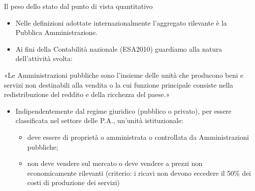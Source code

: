 \documentclass[aspectratio=64,12pt]{beamer}
\begin{document}
\begin{frame}{Il peso dello stato dal punto di vista quantitativo}
\begin{itemize}
\item Nelle definizioni adottate internazionalmente l’aggregato rilevante è la \alert{Pubblica Amministrazione}.
\item Ai fini della Contabilità nazionale (ESA2010) guardiamo alla natura dell’attività
svolta:
\end{itemize}
\begin{quoting}
«Le Amministrazioni pubbliche sono l’insieme delle unità che producono beni e
servizi non destinabili alla vendita o la cui funzione principale consiste
nella redistribuzione del reddito e della ricchezza del paese.»
\end{quoting}
\begin{itemize}
\item Indipendentemente dal regime giuridico (pubblico o privato),
per essere classificata nel settore delle P.A., un'unità istituzionale:
\begin{itemize}
\item deve essere di proprietà o amministrata o controllata da Amministrazioni pubbliche;
\item non deve vendere sul mercato o deve vendere a prezzi non economicamente
rilevanti (criterio: i ricavi non devono eccedere il 50\% dei costi di
produzione dei servizi)
\end{itemize}
\end{itemize}
\end{frame}
\end{document}
